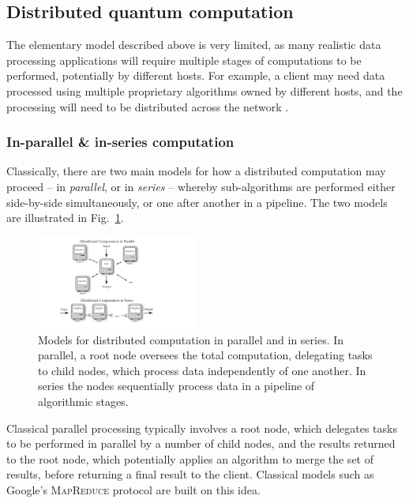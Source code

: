 %
%

\subsection{Distributed quantum computation} \label{sec:dist_QC} 

The elementary model described above is very limited, as many realistic data processing applications will require multiple stages of computations to be performed, potentially by different hosts. For example, a client may need data processed using multiple proprietary algorithms owned by different hosts, and the processing will need to be distributed across the network \cite{bib:Cirac99}.

\subsubsection{In-parallel \& in-series computation}

Classically, there are two main models for how a distributed computation may proceed -- in \textit{parallel}, or in \textit{series} -- whereby sub-algorithms are performed either side-by-side simultaneously, or one after another in a pipeline. The two models are illustrated in Fig.~\ref{fig:distributed}.

\begin{figure}[htpb]
\includegraphics[width=0.47\textwidth]{distributed}
\caption{Models for distributed computation in parallel and in series. In parallel, a root node oversees the total computation, delegating tasks to child nodes, which process data independently of one another. In series the nodes sequentially process data in a pipeline of algorithmic stages.} \label{fig:distributed}
\end{figure}

Classical parallel processing typically involves a root node, which delegates tasks to be performed in parallel by a number of child nodes, and the results returned to the root node, which potentially applies an algorithm to merge the set of results, before returning a final result to the client. Classical models such as Google's \textsc{MapReduce} protocol \cite{bib:MapReduce} are built on this idea.

